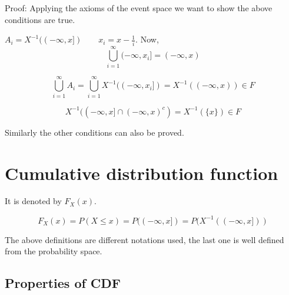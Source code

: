 \documentclass{article}
\begin{document}
Proof: Applying the axioms of the event space we want to show the above conditions are true.

$A_i=X^{-1}((-\infty,x]) \qquad x_i = x - \frac{1}{i}$. Now,
$$ \bigcup_{i=1}^{\infty} (-\infty,x_i] = (-\infty,x)$$

$$ \bigcup_{i=1}^{\infty} A_i = \bigcup_{i=1}^{\infty} X^{-1}((-\infty,x_i]) = X^{-1}((-\infty,x)) \in F$$

$$ X^{-1}((-\infty ,x] \cap {(-\infty,x)}^c) = X^{-1} (\{x\}) \in F$$

Similarly the other conditions can also be proved.

\section{Cumulative distribution function}
It is denoted by $F_X(x)$.

$$ F_X(x)= P(X \leq x) = P((-\infty, x])= P(X^{-1}((-\infty, x]))$$

The above definitions are different notations used, the last one is well defined from the probability space.

\subsection{Properties of CDF}
\end{document}
